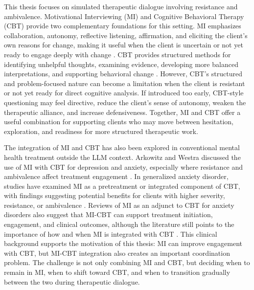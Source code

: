 This thesis focuses on simulated therapeutic dialogue involving resistance and ambivalence. Motivational Interviewing (MI) and Cognitive Behavioral Therapy (CBT) provide two complementary foundations for this setting. MI emphasizes collaboration, autonomy, reflective listening, affirmation, and eliciting the client's own reasons for change, making it useful when the client is uncertain or not yet ready to engage deeply with change \cite{miller2013motivational,bischof2021motivational}. CBT provides structured methods for identifying unhelpful thoughts, examining evidence, developing more balanced interpretations, and supporting behavioral change \cite{beck2020cognitive,chand2023cognitive}. However, CBT's structured and problem-focused nature can become a limitation when the client is resistant or not yet ready for direct cognitive analysis. If introduced too early, CBT-style questioning may feel directive, reduce the client's sense of autonomy, weaken the therapeutic alliance, and increase defensiveness. Together, MI and CBT offer a useful combination for supporting clients who may move between hesitation, exploration, and readiness for more structured therapeutic work.

The integration of MI and CBT has also been explored in conventional mental health treatment outside the LLM context. Arkowitz and Westra discussed the use of MI with CBT for depression and anxiety, especially where resistance and ambivalence affect treatment engagement \cite{arkowitz2004integrating}. In generalized anxiety disorder, studies have examined MI as a pretreatment or integrated component of CBT, with findings suggesting potential benefits for clients with higher severity, resistance, or ambivalence \cite{westra2009adding,westra2016integrating}. Reviews of MI as an adjunct to CBT for anxiety disorders also suggest that MI-CBT can support treatment initiation, engagement, and clinical outcomes, although the literature still points to the importance of how and when MI is integrated with CBT \cite{randall2017motivational,marker2018efficacy}. This clinical background supports the motivation of this thesis: MI can improve engagement with CBT, but MI-CBT integration also creates an important coordination problem. The challenge is not only combining MI and CBT, but deciding when to remain in MI, when to shift toward CBT, and when to transition gradually between the two during therapeutic dialogue.

